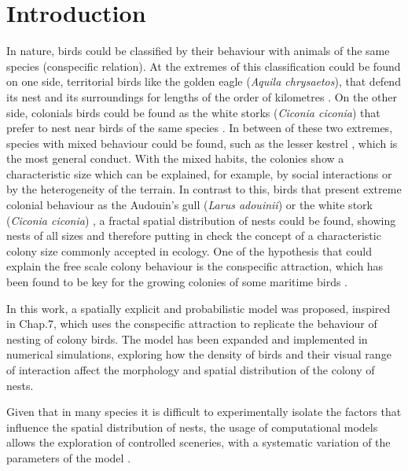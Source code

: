 \documentclass[aps,twocolumn,pre]{revtex4-2}
\begin{document}
\maketitle
 
\section{Introduction}

In nature, birds could be classified by their behaviour with animals of the same species (conspecific relation). At the extremes of this classification could be found on one side, territorial birds like the golden eagle (\textit{Aquila chrysaetos}), that defend its nest and its surroundings for lengths of the order of kilometres \cite{slater2017}. On the other side, colonials birds could be found as the white storks (\textit{Ciconia ciconia}) that prefer to nest near birds of the same species \cite{jovani2007}. In between of these two extremes, species with mixed behaviour could be found, such as the lesser kestrel \cite{jovani2008}, which is the most general conduct. With the mixed habits, the colonies show a characteristic size which can be explained, for example, by social interactions or by the heterogeneity of the terrain. In contrast to this, birds that present extreme colonial behaviour as the Audouin's gull (\textit{Larus adouinii}) or the white stork (\textit{Ciconia ciconia}) \cite{jovani2007}, a fractal spatial distribution of nests could be found, showing nests of all sizes and therefore putting in check the concept of a characteristic colony size commonly accepted in ecology. One of the hypothesis that could explain the free scale colony behaviour is the conspecific attraction, which has been found to be key for the growing colonies of some maritime birds \cite{tenan2017}.

In this work, a spatially explicit and probabilistic model was proposed, inspired in \cite{tesis2006} Chap.7, which uses the conspecific attraction to replicate the behaviour of nesting of colony birds. The model has been expanded and implemented in numerical simulations, exploring how the density of birds and their visual range of interaction affect the morphology and spatial distribution of the colony of nests.

Given that in many species it is difficult to experimentally isolate the factors that influence the spatial distribution of nests, the usage of computational models allows the exploration of controlled sceneries, with a systematic variation of the parameters of the model \cite{bascompte1995, stauffer1994}. 
\end{document}
